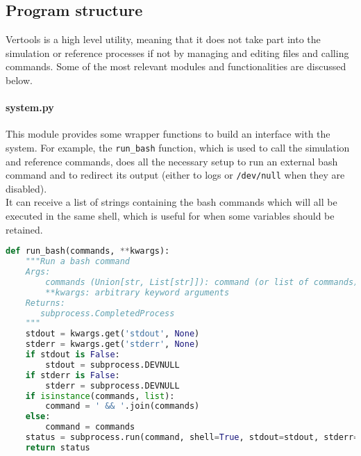 \subsection{Program structure}
Vertools is a high level utility, meaning that it does not take part into the simulation or reference processes if not by managing and editing files and calling commands. Some of the most relevant modules and functionalities are discussed below.

\paragraph{system.py} This module provides some wrapper functions to build an interface with the system. For example, the \texttt{run\_bash} function, which is used to call the simulation and reference commands, does all the necessary setup to run an external bash command and to redirect its output (either to logs or \texttt{/dev/null} when they are disabled).\\
It can receive a list of strings containing the bash commands which will all be executed in the same shell, which is useful for when some variables should be retained.
\begin{lstlisting}[language=Python]
def run_bash(commands, **kwargs):
    """Run a bash command
    Args:
        commands (Union[str, List[str]]): command (or list of commands) to be executed in the same shell
        **kwargs: arbitrary keyword arguments
    Returns:
       subprocess.CompletedProcess
    """
    stdout = kwargs.get('stdout', None)
    stderr = kwargs.get('stderr', None)
    if stdout is False:
        stdout = subprocess.DEVNULL
    if stderr is False:
        stderr = subprocess.DEVNULL
    if isinstance(commands, list):
        command = ' && '.join(commands)
    else:
        command = commands
    status = subprocess.run(command, shell=True, stdout=stdout, stderr=stderr)
    return status
\end{lstlisting}
